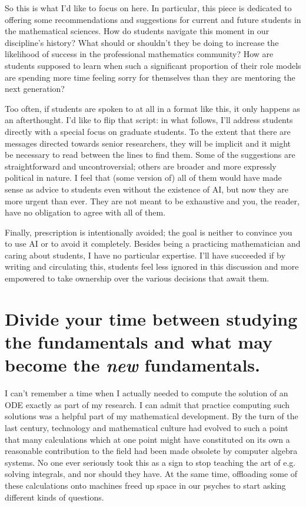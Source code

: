 \documentclass[11pt,reqno]{amsart}
\theoremstyle{plain}
\theoremstyle{definition}
\numberwithin{equation}{section}
\numberwithin{theorem}{section}
\begin{document}
So this is what I’d like to focus on here. In particular, this piece is dedicated to offering some recommendations and suggestions for current and future students in the mathematical sciences. How do students navigate this moment in our discipline’s history? What should or shouldn’t they be doing to increase the likelihood of success in the professional mathematics community? How are students supposed to learn when such a significant proportion of their role models are spending more time feeling sorry for themselves than they are mentoring the next generation? 

Too often, if students are spoken to at all in a format like this, it only happens as an afterthought. I’d like to flip that script: in what follows, I’ll address students directly with a special focus on graduate students. To the extent that there are messages directed towards senior researchers, they will be implicit and it might be necessary to read between the lines to find them. Some of the suggestions are straightforward and uncontroversial; others are broader and more expressly political in nature. I feel that (some version of) all of them would have made sense as advice to students even without the existence of AI, but now they are more urgent than ever. They are not meant to be exhaustive and you, the reader, have no obligation to agree with all of them. 

Finally, prescription is intentionally avoided; the goal is neither to convince you to use AI or to avoid it completely. Besides being a practicing mathematician and caring about students, I have no particular expertise.  I'll have succeeded if by writing and circulating this, students feel less ignored in this discussion and more empowered to take ownership over the various decisions that await them.

\section{Divide your time between studying the fundamentals and what may become the \textit{new} fundamentals. }

I can't remember a time when I actually needed to compute the solution of an ODE exactly as part of my research. I can admit that practice computing such solutions was a helpful part of my mathematical development. By the turn of the last century, technology and mathematical culture had evolved to such a point that many calculations which at one point might have constituted on its own a reasonable contribution to the field had been made obsolete by computer algebra systems. No one ever seriously took this as a sign to stop teaching the art of e.g. solving integrals, and nor should they have. At the same time, offloading some of these calculations onto machines freed up space in our psyches to start asking different kinds of questions.  
\end{document}
